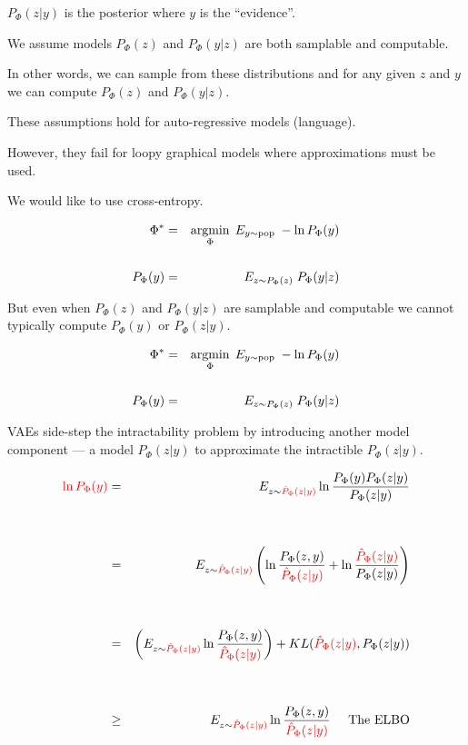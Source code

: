 {\vfill
$P_\Phi(z|y)$ is the posterior where $y$ is the ``evidence''.



We assume models $P_\Phi(z)$ and $P_\Phi(y|z)$ are both samplable and computable.

\vfill
In other words, we can sample from these distributions and for any given $z$ and $y$ we can compute $P_\Phi(z)$ and $P_\Phi(y|z)$.

\vfill
These assumptions hold for auto-regressive models (language).

\vfill
However, they fail for loopy graphical models where approximations must be used.


\vfill
We would like to use cross-entropy.

\begin{eqnarray*}
\Phi^* & = & \operatorname*{argmin}_\Phi \;E_{y \sim \mathrm{pop}}\;-\ln P_\Phi(y) \\
\\
P_\Phi(y) & = & E_{z \sim P_\Phi(z)}\;P_\Phi(y|z)
\end{eqnarray*}

\vfill
But even when $P_\Phi(z)$ and $P_\Phi(y|z)$ are samplable and computable we cannot typically compute $P_\Phi(y)$ or $P_\Phi(z|y)$.


\begin{eqnarray*}
\Phi^* & = & \operatorname*{argmin}_\Phi \;E_{y \sim \mathrm{pop}}\;-\ln P_\Phi(y) \\
\\
P_\Phi(y) & = & E_{z \sim P_\Phi(z)}\;P_\Phi(y|z)
\end{eqnarray*}

\vfill
VAEs side-step the intractability problem by introducing another model component --- a model $\hat{P}_\Phi(z|y)$ to approximate the intractible $P_\Phi(z|y)$.


{\huge
\begin{eqnarray*}
 {\color{red} \ln P_\Phi(y)} & = & E_{z \sim {\color{red} \hat{P}_\Phi(z|y)}} \ln \frac{P_\Phi(y)P_\Phi(z|y)}{P_\Phi(z|y)} \\
        \\
        \\
 & = & E_{z \sim {\color{red} \hat{P}_\Phi(z|y)}} \left(\ln \frac{P_\Phi(z,y)}{{\color{red} \hat{P}_\Phi(z|y)}} + \ln \frac{{\color{red} \hat{P}_\Phi(z|y)}}{P_\Phi(z|y)}\right) \\
 \\
 \\
  & = & \left(E_{z \sim {\color{red} \hat{P}_\Phi(z|y)}} \ln \frac{P_\Phi(z,y)}{{\color{red} \hat{P}_\Phi(z|y)}}\right) + KL({\color{red} \hat{P}_\Phi(z|y)},P_\Phi(z|y)) \\
  \\
  \\
  &  \geq & E_{z \sim {\color{red} \hat{P}_\Phi(z|y)}} \ln \frac{P_\Phi(z,y)}{{\color{red} \hat{P}_\Phi(z|y)}} \;\;\;\;\;\mbox{The ELBO}
\end{eqnarray*}
}

}
